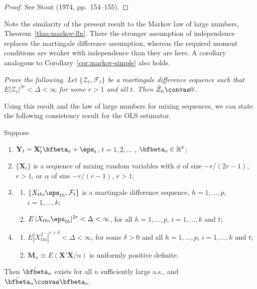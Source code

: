 \begin{proof}
See Stout (1974, pp.~154--155). \qedhere
\end{proof}

Note the similarity of the present result to the Markov law of large numbers, Theorem~\ref{thm:markov-lln}. There the stronger assumption of independence replaces the martingale difference assumption, whereas the required moment conditions are weaker with independence than they are here. A corollary analogous to Corollary~\ref{cor:markov-simple} also holds.

\begin{exercises}
\item\label{ex:mds-corollary} \emph{Prove the following. Let $\{\mathcal{Z}_t, \mathcal{F}_t\}$ be a martingale difference sequence such that $E|\mathcal{Z}_t|^{2r} < \Delta < \infty$ for some $r > 1$ and all $t$. Then $\bar{\mathcal{Z}}_n \convas 0$.}
\end{exercises}

Using this result and the law of large numbers for mixing sequences, we can state the following consistency result for the OLS estimator.

\begin{theorem}\label{thm:ols-mds}
Suppose
\begin{enumerate}[label=(\roman*)]
\item $\mathbf{Y}_t = \mathbf{X}_t' \bfbeta_o + \eps_t$, \quad $t = 1, 2, \ldots$ , $\bfbeta_o \in \mathbb{R}^k$;
\item $\{\mathbf{X}_t\}$ is a sequence of mixing random variables with $\phi$ of size $-r/(2r-1)$, $r > 1$, or $\alpha$ of size $-r/(r-1)$, $r > 1$;
\item \begin{enumerate}[label=(\alph*)]
\item $\{X_{thi} \eps_{th}, \mathcal{F}_t\}$ is a martingale difference sequence, $h = 1, \ldots, p$, $i = 1, \ldots, k$;
\item $E\,|X_{thi} \eps_{th}|^{2r} < \Delta < \infty$, for all $h = 1, \ldots, p$, $i = 1, \ldots, k$ and $t$;
\end{enumerate}
\item \begin{enumerate}[label=(\alph*)]
\item $E|X_{thi}^2|^{r+\delta} < \Delta < \infty$, for some $\delta > 0$ and all $h = 1, \ldots, p$, $i = 1, \ldots, k$ and $t$;
\item $\mathbf{M}_n \equiv E(\mathbf{X}'\mathbf{X}/n)$ is uniformly positive definite.
\end{enumerate}
\end{enumerate}
Then $\hat{\bfbeta}_n$ exists for all $n$ sufficiently large a.s., and $\hat{\bfbeta}_n \convas \bfbeta_o$.
\end{theorem}

